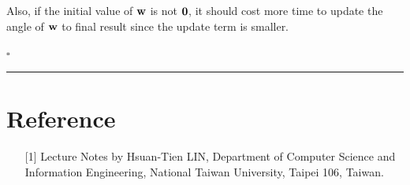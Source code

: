 \documentclass[12pt]{article}
\newcommand*{\QEDB}{\hfill\ensuremath{\square}}
\newcommand{\BF}[1]{{\bf#1}}
\newcommand{\horrule}[1]{\rule{\linewidth}{#1}}
\begin{document}
Also, if the initial value of $\BF{w}$ is not $\BF{0}$, it should cost more time to update the angle of $\BF{w}$ to final result since the update term is smaller.

\QEDB

\horrule{0.5pt}

\section*{Reference}

\begin{enumerate}

\item[{[1]}] Lecture Notes by Hsuan-Tien LIN, Department of Computer Science and Information Engineering, National Taiwan University, Taipei 106, Taiwan.

\end{enumerate}

\end{document}
